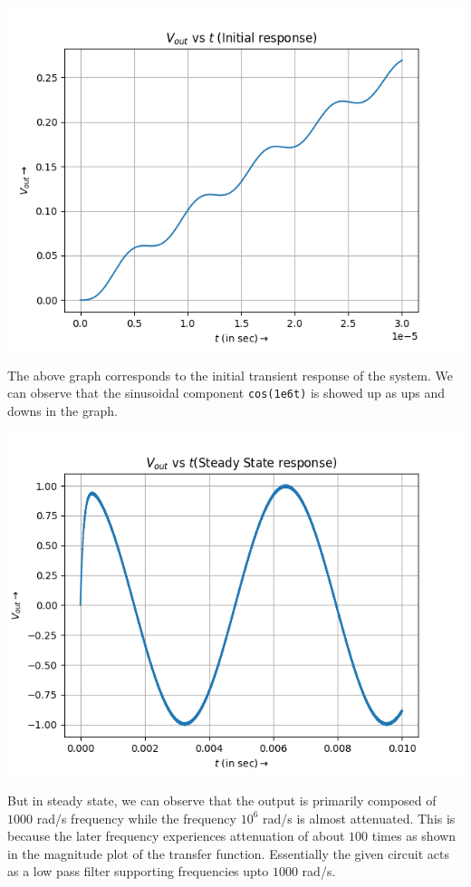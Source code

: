 \documentclass[12pt, a4paper]{report}
\begin{document}
\begin{center}
	\includegraphics[scale=0.8]{Figure_5} 
	\label{fig:rawdata}
\end{center}
The above graph corresponds to the initial transient response of the system. We can observe that the sinusoidal component \texttt{cos(1e6t)} is showed up as ups and downs in the graph.  
\begin{center}
	\includegraphics[scale=0.8]{Figure_6} 
	\label{fig:rawdata}
\end{center}
But in steady state, we can observe that the output is primarily composed of $1000$ rad/s frequency while the frequency $10^6$ rad/s is almost attenuated. This is because the later frequency experiences attenuation of about $100$ times as shown in the magnitude plot of the transfer function. Essentially the given circuit acts as a low pass filter supporting frequencies upto $1000$ rad/s. 
\end{document}
